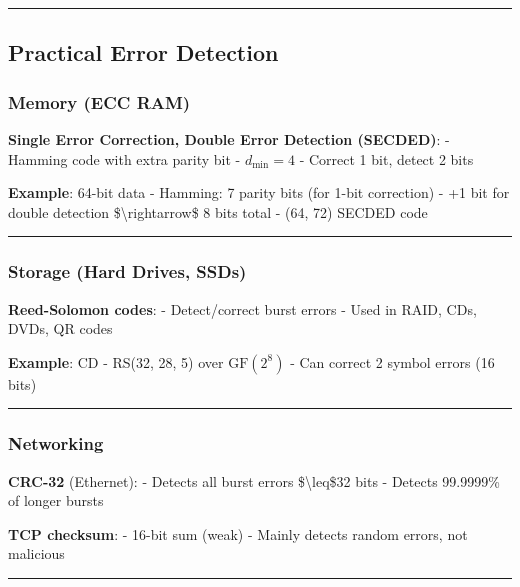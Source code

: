\begin{center}\rule{0.5\linewidth}{0.5pt}\end{center}

\subsection{Practical Error Detection}\label{practical-error-detection}

\subsubsection{Memory (ECC RAM)}\label{memory-ecc-ram}

\textbf{Single Error Correction, Double Error Detection (SECDED)}: -
Hamming code with extra parity bit - \(d_{\min} = 4\) - Correct 1 bit,
detect 2 bits

\textbf{Example}: 64-bit data - Hamming: 7 parity bits (for 1-bit
correction) - +1 bit for double detection \$\textbackslash rightarrow\$
8 bits total - (64, 72) SECDED code

\begin{center}\rule{0.5\linewidth}{0.5pt}\end{center}

\subsubsection{Storage (Hard Drives,
SSDs)}\label{storage-hard-drives-ssds}

\textbf{Reed-Solomon codes}: - Detect/correct burst errors - Used in
RAID, CDs, DVDs, QR codes

\textbf{Example}: CD - RS(32, 28, 5) over \(\mathrm{GF}(2^8)\) - Can
correct 2 symbol errors (16 bits)

\begin{center}\rule{0.5\linewidth}{0.5pt}\end{center}

\subsubsection{Networking}\label{networking}

\textbf{CRC-32} (Ethernet): - Detects all burst errors
\$\textbackslash leq\$32 bits - Detects 99.9999\% of longer bursts

\textbf{TCP checksum}: - 16-bit sum (weak) - Mainly detects random
errors, not malicious

\begin{center}\rule{0.5\linewidth}{0.5pt}\end{center}

